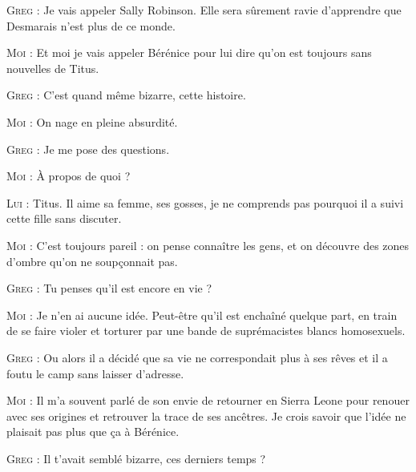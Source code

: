 \ornamentalrule

\illuspagebreak

\begin{dialogue}

\textsc{Greg} : Je vais appeler Sally Robinson. Elle sera sûrement ravie d’apprendre que Desmarais n’est plus de ce monde.

\textsc{Moi} : Et moi je vais appeler Bérénice pour lui dire qu’on est toujours sans nouvelles de Titus.

\textsc{Greg} : C’est quand même bizarre, cette histoire.

\textsc{Moi} : On nage en pleine absurdité.

\textsc{Greg} : Je me pose des questions.

\textsc{Moi} : À propos de quoi ?

\textsc{Lui} : Titus. Il aime sa femme, ses gosses, je ne comprends pas pourquoi il a suivi cette fille sans discuter.

\textsc{Moi} : C’est toujours pareil : on pense connaître les gens, et on découvre des zones d’ombre qu’on ne soupçonnait pas.

\textsc{Greg} : Tu penses qu’il est encore en vie ?

\textsc{Moi} : Je n’en ai aucune idée. Peut-être qu’il est enchaîné quelque part, en train de se faire violer et torturer par une bande de suprémacistes blancs homosexuels.

\textsc{Greg} : Ou alors il a décidé que sa vie ne correspondait plus à ses rêves et il a foutu le camp sans laisser d’adresse.

\textsc{Moi} : Il m’a souvent parlé de son envie de retourner en Sierra Leone pour renouer avec ses origines et retrouver la trace de ses ancêtres. Je crois savoir que l’idée ne plaisait pas plus que ça à Bérénice.

%
%
%
\textsc{Greg} : Il t’avait semblé bizarre, ces derniers temps ?


\end{dialogue}
